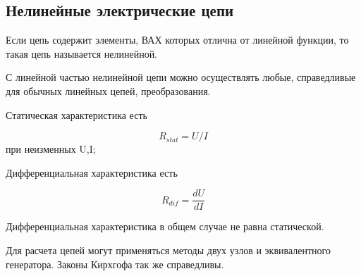 \subsection{Нелинейные электрические цепи}

Если цепь содержит элементы, ВАХ которых отлична от линейной функции, то такая цепь называется нелинейной.

С линейной частью нелинейной цепи можно осуществлять любые, справедливые для обычных линейных цепей, преобразования.

Статическая характеристика есть

\begin{equation}
R_{stat}=U/I
\end{equation}
при неизменных U,I;

Дифференциальная характеристика есть

\begin{equation}
R_{dif}=\frac{dU}{dI}
\end{equation}

Дифференциальная характеристика в общем случае не равна статической.

Для расчета цепей могут применяться методы двух узлов и эквивалентного генератора. Законы Кирхгофа так же справедливы.


\pagebreak
